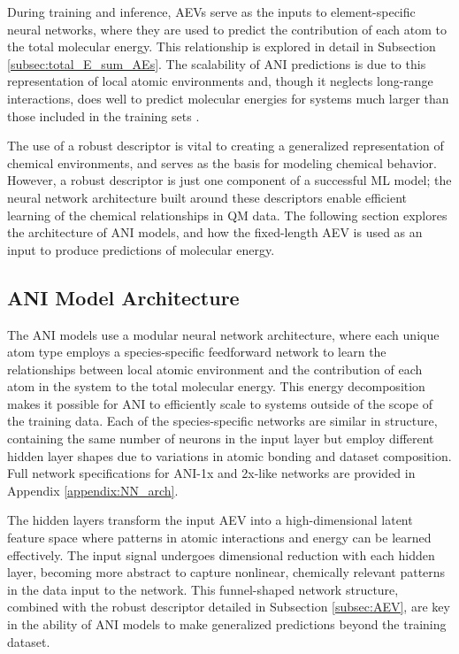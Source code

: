 During training and inference, AEVs serve as the inputs to element-specific neural networks, where they are used to predict the contribution of each atom to the total molecular energy.
This relationship is explored in detail in Subsection \ref{subsec:total_E_sum_AEs}.
The scalability of ANI predictions is due to this representation of local atomic environments and, though it neglects long-range interactions, does well to predict molecular energies for systems much larger than those included in the training sets \cite{ani-1x, ani-2x}.

The use of a robust descriptor is vital to creating a generalized representation of chemical environments, and serves as the basis for modeling chemical behavior.
However, a robust descriptor is just one component of a successful ML model; the neural network architecture built around these descriptors enable efficient learning of the chemical relationships in QM data.
The following section explores the architecture of ANI models, and how the fixed-length AEV is used as an input to produce predictions of molecular energy.


\subsection{ANI Model Architecture}
\label{subsec:ANI_model_arch}

The ANI models use a modular neural network architecture, where each unique atom type employs a species-specific feedforward network to learn the relationships between local atomic environment and the contribution of each atom in the system to the total molecular energy.
This energy decomposition makes it possible for ANI to efficiently scale to systems outside of the scope of the training data. 
Each of the species-specific networks are similar in structure, containing the same number of neurons in the input layer but employ different hidden layer shapes due to variations in atomic bonding and dataset composition.
Full network specifications for ANI-1x and 2x-like networks are provided in Appendix \ref{appendix:NN_arch}.

The hidden layers transform the input AEV into a high-dimensional latent feature space where patterns in atomic interactions and energy can be learned effectively.
The input signal undergoes dimensional reduction with each hidden layer, becoming more abstract to capture nonlinear, chemically relevant patterns in the data input to the network. 
This funnel-shaped network structure, combined with the robust descriptor detailed in Subsection \ref{subsec:AEV}, are key in the ability of ANI models to make generalized predictions beyond the training dataset.

